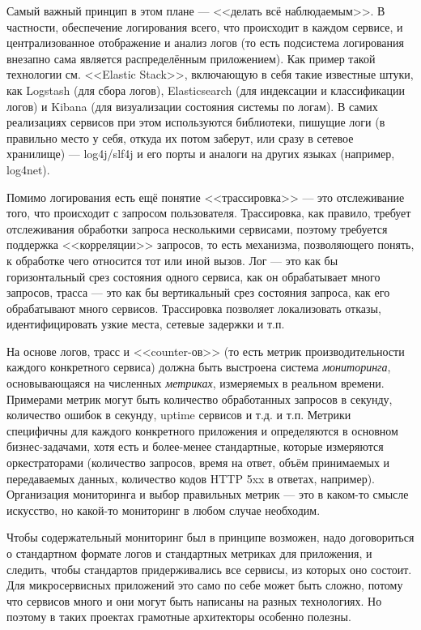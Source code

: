 \documentclass{../text-style}
\begin{document}
Самый важный принцип в этом плане --- <<делать всё наблюдаемым>>. В частности, обеспечение логирования всего, что происходит в каждом сервисе, и централизованное отображение и анализ логов (то есть подсистема логирования внезапно сама является распределённым приложением). Как пример такой технологии см. <<Elastic Stack>>, включающую в себя такие известные штуки, как Logstash (для сбора логов), Elasticsearch (для индексации и классификации логов) и Kibana (для визуализации состояния системы по логам). В самих реализациях сервисов при этом используются библиотеки, пишущие логи (в правильно место у себя, откуда их потом заберут, или сразу в сетевое хранилище) --- log4j/slf4j и его порты и аналоги на других языках (например, log4net).

Помимо логирования есть ещё понятие <<трассировка>> --- это отслеживание того, что происходит с запросом пользователя. Трассировка, как правило, требует отслеживания обработки запроса несколькими сервисами, поэтому требуется поддержка <<корреляции>> запросов, то есть механизма, позволяющего понять, к обработке чего относится тот или иной вызов. Лог --- это как бы горизонтальный срез состояния одного сервиса, как он обрабатывает много запросов, трасса --- это как бы вертикальный срез состояния запроса, как его обрабатывают много сервисов. Трассировка позволяет локализовать отказы, идентифицировать узкие места, сетевые задержки и т.п.

На основе логов, трасс и <<counter-ов>> (то есть метрик производительности каждого конкретного сервиса) должна быть выстроена система \emph{мониторинга}, основывающаяся на численных \emph{метриках}, измеряемых в реальном времени. Примерами метрик могут быть количество обработанных запросов в секунду, количество ошибок в секунду, uptime сервисов и т.д. и т.п. Метрики специфичны для каждого конкретного приложения и определяются в основном бизнес-задачами, хотя есть и более-менее стандартные, которые измеряются оркестраторами (количество запросов, время на ответ, объём принимаемых и передаваемых данных, количество кодов HTTP 5xx в ответах, например). Организация мониторинга и выбор правильных метрик --- это в каком-то смысле искусство, но какой-то мониторинг в любом случае необходим.

Чтобы содержательный мониторинг был в принципе возможен, надо договориться о стандартном формате логов и стандартных метриках для приложения, и следить, чтобы стандартов придерживались все сервисы, из которых оно состоит. Для микросервисных приложений это само по себе может быть сложно, потому что сервисов много и они могут быть написаны на разных технологиях. Но поэтому в таких проектах грамотные архитекторы особенно полезны.
\end{document}
